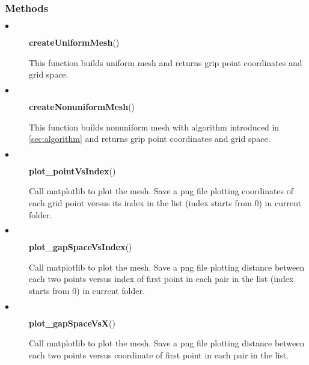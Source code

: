 \documentclass[11pt]{article}
\begin{document}
	\subsubsection{Methods}
        \begin{description}
	    \item[$\bullet$] \textbf{createUniformMesh}()
                \par
		This function builds uniform mesh and returns grip point coordinates and grid space.
	    \item[$\bullet$] \textbf{createNonuniformMesh}()
		\par
		This function builds nonuniform mesh with algorithm introduced in \ref{sec:algorithm} and returns grip point coordinates and grid space.
	    \item[$\bullet$] \textbf{plot\_pointVsIndex}()
		\par
                Call matplotlib to plot the mesh. Save a png file plotting coordinates of each grid point versus its index in the list (index starts from 0) in current folder.
	    \item[$\bullet$] \textbf{plot\_gapSpaceVsIndex}()
		\par
                Call matplotlib to plot the mesh. Save a png file plotting distance between each two points versus index of first point in each pair in the list (index starts from 0) in current folder.
	    \item[$\bullet$] \textbf{plot\_gapSpaceVsX}()
		\par
                Call matplotlib to plot the mesh. Save a png file plotting distance between each two points versus coordinate of first point in each pair in the list.
	\end{description}
\end{document}
